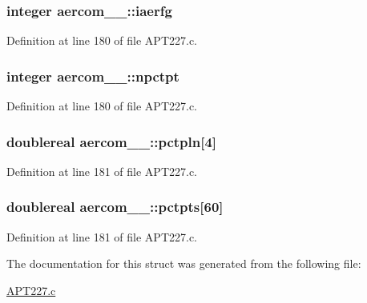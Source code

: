 \subsubsection[{\texorpdfstring{iaerfg}{iaerfg}}]{\setlength{\rightskip}{0pt plus 5cm}integer aercom\+\_\+\_\+\+::iaerfg}\hypertarget{structaercom__1___a656ade274706684e2d03123560edd226}{}\label{structaercom__1___a656ade274706684e2d03123560edd226}


Definition at line 180 of file A\+P\+T227.\+c.

\subsubsection[{\texorpdfstring{npctpt}{npctpt}}]{\setlength{\rightskip}{0pt plus 5cm}integer aercom\+\_\+\_\+\+::npctpt}\hypertarget{structaercom__1___a662b5dbe10213b1bf10c7e03fdb26c11}{}\label{structaercom__1___a662b5dbe10213b1bf10c7e03fdb26c11}


Definition at line 180 of file A\+P\+T227.\+c.

\subsubsection[{\texorpdfstring{pctpln}{pctpln}}]{\setlength{\rightskip}{0pt plus 5cm}doublereal aercom\+\_\+\_\+\+::pctpln\mbox{[}4\mbox{]}}\hypertarget{structaercom__1___a156ca4cdb2e16cfa40ee9634caf890d2}{}\label{structaercom__1___a156ca4cdb2e16cfa40ee9634caf890d2}


Definition at line 181 of file A\+P\+T227.\+c.

\subsubsection[{\texorpdfstring{pctpts}{pctpts}}]{\setlength{\rightskip}{0pt plus 5cm}doublereal aercom\+\_\+\_\+\+::pctpts\mbox{[}60\mbox{]}}\hypertarget{structaercom__1___a3d6582c8aaff0857d2b22dece351b2ef}{}\label{structaercom__1___a3d6582c8aaff0857d2b22dece351b2ef}


Definition at line 181 of file A\+P\+T227.\+c.



The documentation for this struct was generated from the following file\+:\begin{DoxyCompactItemize}
\item 
\hyperlink{APT227_8c}{A\+P\+T227.\+c}\end{DoxyCompactItemize}
